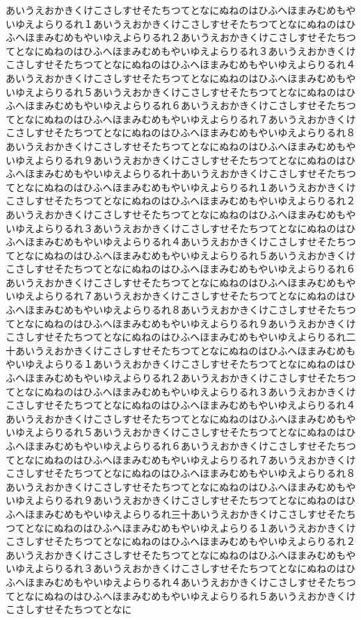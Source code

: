 \documentclass[uplatex,dvipdfmx,11pt]{jsbook}
\begin{document}
  \newpage

      あいうえおかきくけこさしすせそたちつてとなにぬねのはひふへほまみむめもやいゆえよらりるれ１あいうえおかきくけこさしすせそたちつてとなにぬねのはひふへほまみむめもやいゆえよらりるれ２あいうえおかきくけこさしすせそたちつてとなにぬねのはひふへほまみむめもやいゆえよらりるれ３あいうえおかきくけこさしすせそたちつてとなにぬねのはひふへほまみむめもやいゆえよらりるれ４あいうえおかきくけこさしすせそたちつてとなにぬねのはひふへほまみむめもやいゆえよらりるれ５あいうえおかきくけこさしすせそたちつてとなにぬねのはひふへほまみむめもやいゆえよらりるれ６あいうえおかきくけこさしすせそたちつてとなにぬねのはひふへほまみむめもやいゆえよらりるれ７あいうえおかきくけこさしすせそたちつてとなにぬねのはひふへほまみむめもやいゆえよらりるれ８あいうえおかきくけこさしすせそたちつてとなにぬねのはひふへほまみむめもやいゆえよらりるれ９あいうえおかきくけこさしすせそたちつてとなにぬねのはひふへほまみむめもやいゆえよらりるれ十あいうえおかきくけこさしすせそたちつてとなにぬねのはひふへほまみむめもやいゆえよらりるれ１あいうえおかきくけこさしすせそたちつてとなにぬねのはひふへほまみむめもやいゆえよらりるれ２あいうえおかきくけこさしすせそたちつてとなにぬねのはひふへほまみむめもやいゆえよらりるれ３あいうえおかきくけこさしすせそたちつてとなにぬねのはひふへほまみむめもやいゆえよらりるれ４あいうえおかきくけこさしすせそたちつてとなにぬねのはひふへほまみむめもやいゆえよらりるれ５あいうえおかきくけこさしすせそたちつてとなにぬねのはひふへほまみむめもやいゆえよらりるれ６あいうえおかきくけこさしすせそたちつてとなにぬねのはひふへほまみむめもやいゆえよらりるれ７あいうえおかきくけこさしすせそたちつてとなにぬねのはひふへほまみむめもやいゆえよらりるれ８あいうえおかきくけこさしすせそたちつてとなにぬねのはひふへほまみむめもやいゆえよらりるれ９あいうえおかきくけこさしすせそたちつてとなにぬねのはひふへほまみむめもやいゆえよらりるれ二十あいうえおかきくけこさしすせそたちつてとなにぬねのはひふへほまみむめもやいゆえよらりる１あいうえおかきくけこさしすせそたちつてとなにぬねのはひふへほまみむめもやいゆえよらりるれ２あいうえおかきくけこさしすせそたちつてとなにぬねのはひふへほまみむめもやいゆえよらりるれ３あいうえおかきくけこさしすせそたちつてとなにぬねのはひふへほまみむめもやいゆえよらりるれ４あいうえおかきくけこさしすせそたちつてとなにぬねのはひふへほまみむめもやいゆえよらりるれ５あいうえおかきくけこさしすせそたちつてとなにぬねのはひふへほまみむめもやいゆえよらりるれ６あいうえおかきくけこさしすせそたちつてとなにぬねのはひふへほまみむめもやいゆえよらりるれ７あいうえおかきくけこさしすせそたちつてとなにぬねのはひふへほまみむめもやいゆえよらりるれ８あいうえおかきくけこさしすせそたちつてとなにぬねのはひふへほまみむめもやいゆえよらりるれ９あいうえおかきくけこさしすせそたちつてとなにぬねのはひふへほまみむめもやいゆえよらりるれ三十あいうえおかきくけこさしすせそたちつてとなにぬねのはひふへほまみむめもやいゆえよらりる１あいうえおかきくけこさしすせそたちつてとなにぬねのはひふへほまみむめもやいゆえよらりるれ２あいうえおかきくけこさしすせそたちつてとなにぬねのはひふへほまみむめもやいゆえよらりるれ３あいうえおかきくけこさしすせそたちつてとなにぬねのはひふへほまみむめもやいゆえよらりるれ４あいうえおかきくけこさしすせそたちつてとなにぬねのはひふへほまみむめもやいゆえよらりるれ５あいうえおかきくけこさしすせそたちつてとなに
\end{document}
